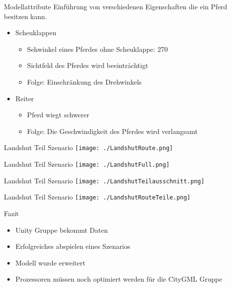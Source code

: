 \begin{frame}{Modellattribute}
Einführung von verschiedenen Eigenschaften die ein Pferd besitzen kann.
\begin{itemize}
	\item Scheuklappen\cite{Wikipedia-Scheuklappen}
	\begin{itemize}
		\item Sehwinkel eines Pferdes ohne Scheuklappe: 270\degree \cite{barnboox.de}
		\item Sichtfeld des Pferdes wird beeinträchtigt
		\item Folge: Einschränkung des Drehwinkels
	\end{itemize}
	\item Reiter
	\begin{itemize}
		\item Pferd wiegt schwerer
		\item Folge: Die Geschwindigkeit des Pferdes wird verlangsamt
	\end{itemize}
\end{itemize}
\end{frame}

\begin{frame}{Landshut Teil Szenario}
	\texttt{[image: ./LandshutRoute.png]}
\end{frame}

\begin{frame}{Landshut Teil Szenario}
	\texttt{[image: ./LandshutFull.png]}
\end{frame}

\begin{frame}{Landshut Teil Szenario}
	\texttt{[image: ./LandshutTeilausschnitt.png]}
\end{frame}

\begin{frame}{Landshut Teil Szenario}
	\texttt{[image: ./LandshutRouteTeile.png]}
\end{frame}

\begin{frame}{Fazit}
	\begin{itemize}
		\item Unity Gruppe bekommt Daten
		\item Erfolgreiches abspielen eines Szenarios
		\item Modell wurde erweitert
		\item Prozessoren müssen noch optimiert werden für die CityGML Gruppe
	\end{itemize}
\end{frame}

